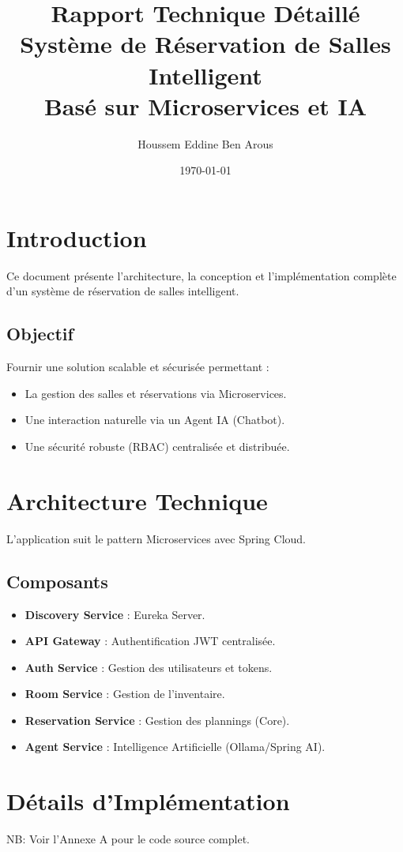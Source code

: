 \documentclass[12pt, a4paper]{report}
\title{\textbf{Rapport Technique Détaillé}\\Système de Réservation de Salles Intelligent\\Basé sur Microservices et IA}
\author{Houssem Eddine Ben Arous}
\date{\today}
\begin{document}
\maketitle
\tableofcontents

\chapter{Introduction}
Ce document présente l'architecture, la conception et l'implémentation complète d'un système de réservation de salles intelligent.

\section{Objectif}
Fournir une solution scalable et sécurisée permettant :
\begin{itemize}
    \item La gestion des salles et réservations via Microservices.
    \item Une interaction naturelle via un Agent IA (Chatbot).
    \item Une sécurité robuste (RBAC) centralisée et distribuée.
\end{itemize}

\chapter{Architecture Technique}
L'application suit le pattern Microservices avec Spring Cloud.

\section{Composants}
\begin{itemize}
    \item \textbf{Discovery Service} : Eureka Server.
    \item \textbf{API Gateway} : Authentification JWT centralisée.
    \item \textbf{Auth Service} : Gestion des utilisateurs et tokens.
    \item \textbf{Room Service} : Gestion de l'inventaire.
    \item \textbf{Reservation Service} : Gestion des plannings (Core).
    \item \textbf{Agent Service} : Intelligence Artificielle (Ollama/Spring AI).
\end{itemize}

\chapter{Détails d'Implémentation}
NB: Voir l'Annexe A pour le code source complet.
\end{document}
